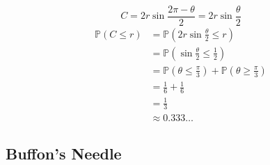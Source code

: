 \begin{example}[cont.]
\begin{tikzpicture}[x=0.75pt,y=0.75pt,yscale=-1,xscale=1]
\end{tikzpicture}\\
\[C = 2r\sin\frac{2\pi - \theta}{2} = 2r\sin\frac{\theta}{2}\]
\begin{align*}
    \mathbb{P}(C\leq r) &= \mathbb{P}(2r\sin\frac{\theta}{2}\leq r)\\
    &= \mathbb{P}(\sin\frac{\theta}{2}\leq \frac{1}{2})\\
    &=\mathbb{P}(\theta\leq \frac{\pi}{3}) + \mathbb{P}(\theta\geq \frac{\pi}{3})\\
    &=\frac{1}{6}+\frac{1}{6}\\
    &=\frac{1}{3}\\
    &\approx 0.333\dots
\end{align*}
\end{example}

\subsection{Buffon's Needle}
